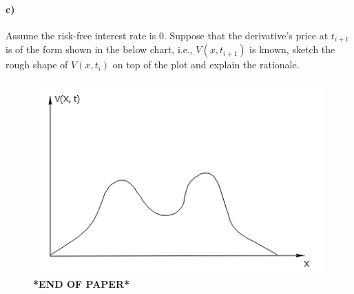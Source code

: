 \documentclass[11pt,a4paper,hidelinks,fleqn]{article}            %
\begin{document}
\paragraph{c)} Assume the risk-free interest rate is 0. Suppose that the derivative's price at $t_{i+1}$ is of the form shown in the below chart,
i.e., $V(x, t_{i+1})$ is known, 
sketch the rough shape of $V(x, t_{i})$ on top of the plot and explain the rationale.
\begin{figure}[h]
\includegraphics[scale=0.9]{./6c} \\
\vspace{1cm}
\textbf{*END OF PAPER*}
\end{figure}
\end{document}
